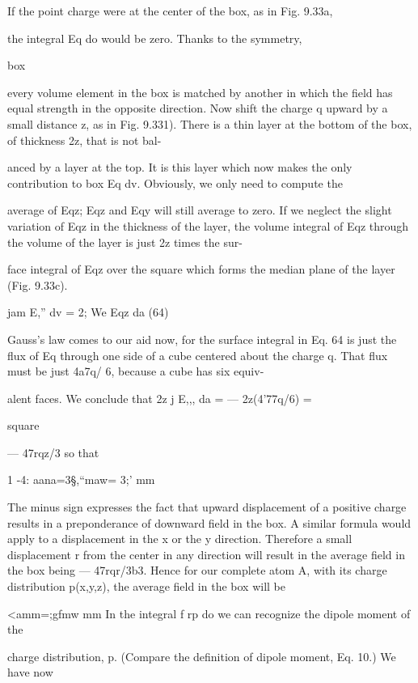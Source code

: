 {{If the point charge were at the center of the box, as in Fig. 9.33a,

the integral Eq do would be zero. Thanks to the symmetry,

box

every volume element in the box is matched by another in which the
field has equal strength in the opposite direction. Now shift the
charge q upward by a small distance z, as in Fig. 9.331). There is a
thin layer at the bottom of the box, of thickness 2z, that is not bal-

 

anced by a layer at the top. It is this layer which now makes the only
contribution to box Eq dv. Obviously, we only need to compute the

average of Eqz; Eqz and Eqy will still average to zero. If we neglect the
slight variation of Eqz in the thickness of the layer, the volume integral
of Eqz through the volume of the layer is just 2z times the sur-

face integral of Eqz over the square which forms the median plane
of the layer (Fig. 9.33c).

\begin{equation}
\end{equation}
jam E,'' dv = 2; We Eqz da (64)

Gauss's law comes to our aid now, for the surface integral in Eq. 64
is just the flux of Eq through one side of a cube centered about the
charge q. That flux must be just 4a7q/ 6, because a cube has six equiv-

alent faces. We conclude that 2z j E,,, da =  --- 2z(4'77q/6) =

square

 ---  47rqz/3 so that

1 -4:
aana=3§,``maw= 3;' mm

The minus sign expresses the fact that upward displacement of a
positive charge results in a preponderance of downward field in the
box. A similar formula would apply to a displacement in the x or
the y direction. Therefore a small displacement r from the center in
any direction will result in the average field in the box being
 --- 47rqr/3b3. Hence for our complete atom A, with its charge distribution
p(x,y,z), the average field in the box will be

<amm=;gfmw mm
In the integral f rp do we can recognize the dipole moment of the

charge distribution, p. (Compare the definition of dipole moment,
Eq. 10.) We have now

}}
